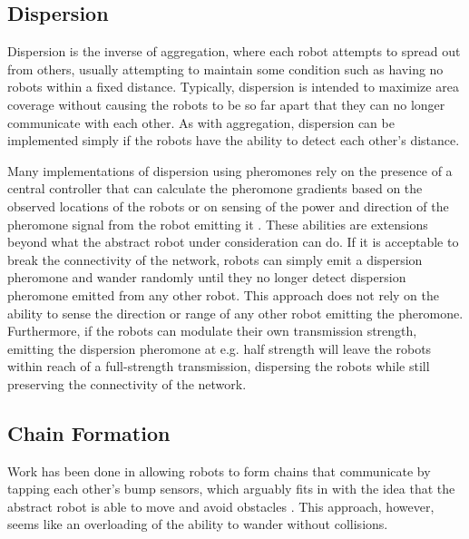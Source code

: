 \documentclass[]{article}
\begin{document}
\subsection{Dispersion} \label{morpho_disperse}

Dispersion is the inverse of aggregation, where each robot attempts to spread out from others, usually attempting to maintain some condition such as having no robots within a fixed distance. 
Typically, dispersion is intended to maximize area coverage without causing the robots to be so far apart that they can no longer communicate with each other. 
As with aggregation, dispersion can be implemented simply if the robots have the ability to detect each other's distance. 


Many implementations of dispersion using pheromones rely on the presence of a central controller that can calculate the pheromone gradients based on the observed locations of the robots or on sensing of the power and direction of the pheromone signal from the robot emitting it \cite{pearce2003dispersion, payton2001pheromone}. 
These abilities are extensions beyond what the abstract robot under consideration can do. 
If it is acceptable to break the connectivity of the network, robots can simply emit a dispersion pheromone and wander randomly until they no longer detect dispersion pheromone emitted from any other robot. 
This approach does not rely on the ability to sense the direction or range of any other robot emitting the pheromone.
Furthermore, if the robots can modulate their own transmission strength, emitting the dispersion pheromone at e.g. half strength will leave the robots within reach of a full-strength transmission, dispersing the robots while still preserving the connectivity of the network. 

\subsection{Chain Formation}

Work has been done in allowing robots to form chains that communicate by tapping each other's bump sensors, which arguably fits in with the idea that the abstract robot is able to move and avoid obstacles \cite{Werger96roboticfood}. 
This approach, however, seems like an overloading of the ability to wander without collisions.
\end{document}
